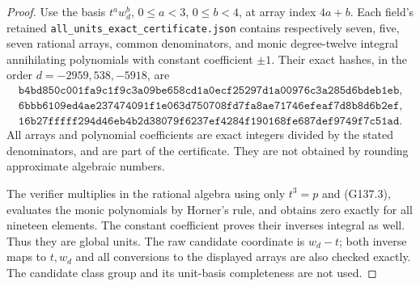 \begin{proof}
Use the basis $t^a w_d^b$, $0\le a<3$, $0\le b<4$, at array
index $4a+b$.  Each field's retained
\texttt{all\_units\_exact\_certificate.json} contains respectively
seven, five, seven rational arrays, common denominators, and
monic degree-twelve integral annihilating polynomials with
constant coefficient $\pm1$.
Their exact hashes, in the order $d=-2959,538,-5918$, are
\begin{gather*}
\texttt{b4bd850c001fa9c1f9c3a09be658cd1a}\allowbreak
\texttt{0ecf25297d1a00976c3a285d6bdeb1eb},\\
\texttt{6bbb6109ed4ae237474091f1e063d750}\allowbreak
\texttt{708fd7fa8ae71746efeaf7d8b8d6b2ef},\\
\texttt{16b27fffff294d46eb4b2d38079f6237}\allowbreak
\texttt{ef4284f190168fe687def9749f7c51ad}.
\end{gather*}
All arrays and polynomial coefficients are exact integers divided
by the stated denominators, and are part of the certificate.
They are not obtained by rounding approximate algebraic numbers.

The verifier multiplies in the rational algebra using only
$t^3=p$ and (G137.3), evaluates the monic polynomials by Horner's
rule, and obtains zero exactly for all nineteen elements.
The constant coefficient proves their inverses integral as well.
Thus they are global units.
The raw candidate coordinate is $w_d-t$; both inverse maps to
$t,w_d$ and all conversions to the displayed arrays are also
checked exactly.  The candidate class group and its unit-basis
completeness are not used.


\end{proof}
